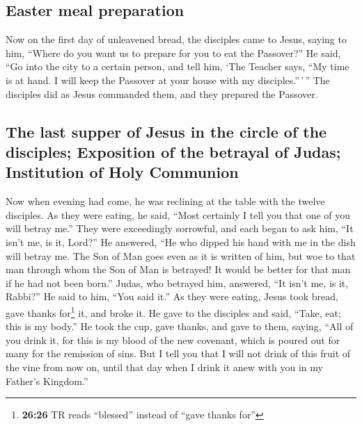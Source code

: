 \hypertarget{easter-meal-preparation}{%
\subsection{Easter meal preparation}\label{easter-meal-preparation}}

 Now on the first day of unleavened bread, the disciples
came to Jesus, saying to him, ``Where do you want us to prepare for you
to eat the Passover?''  He said, ``Go into the city to a
certain person, and tell him, `The Teacher says, ``My time is at hand. I
will keep the Passover at your house with my disciples.''\,'\,''
 The disciples did as Jesus commanded them, and they
prepared the Passover.

\hypertarget{the-last-supper-of-jesus-in-the-circle-of-the-disciples-exposition-of-the-betrayal-of-judas-institution-of-holy-communion}{%
\subsection{The last supper of Jesus in the circle of the disciples;
Exposition of the betrayal of Judas; Institution of Holy
Communion}\label{the-last-supper-of-jesus-in-the-circle-of-the-disciples-exposition-of-the-betrayal-of-judas-institution-of-holy-communion}}

 Now when evening had come, he was reclining at the table
with the twelve disciples.  As they were eating, he said,
``Most certainly I tell you that one of you will betray me.''
 They were exceedingly sorrowful, and each began to ask
him, ``It isn't me, is it, Lord?''  He answered, ``He who
dipped his hand with me in the dish will betray me.  The
Son of Man goes even as it is written of him, but woe to that man
through whom the Son of Man is betrayed! It would be better for that man
if he had not been born.''  Judas, who betrayed him,
answered, ``It isn't me, is it, Rabbi?'' He said to him, ``You said
it.''  As they were eating, Jesus took bread, gave thanks
for\footnote{\textbf{26:26} TR reads ``blessed'' instead of ``gave
  thanks for''} it, and broke it. He gave to the disciples and said,
``Take, eat; this is my body.''  He took the cup, gave
thanks, and gave to them, saying, ``All of you drink it, 
for this is my blood of the new covenant, which is poured out for many
for the remission of sins.  But I tell you that I will
not drink of this fruit of the vine from now on, until that day when I
drink it anew with you in my Father's Kingdom.''

